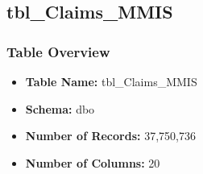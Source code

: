 \begin{landscape}
\subsection{tbl\_Claims\_MMIS}

\subsubsection{Table Overview}
\begin{itemize}
\item \textbf{Table Name:} tbl\_Claims\_MMIS
\item \textbf{Schema:} dbo
\item \textbf{Number of Records:} 37,750,736
\item \textbf{Number of Columns:} 20
\end{itemize}


\end{landscape}
